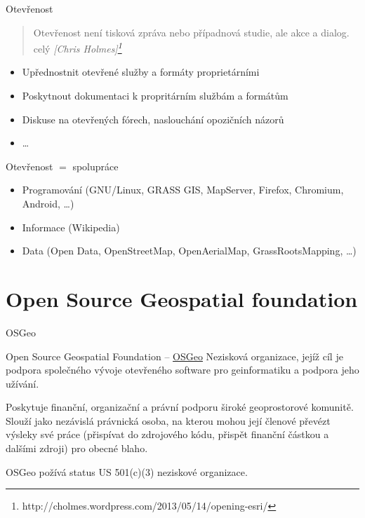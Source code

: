 \documentclass{beamer}
\begin{document}
\begin{frame}{Otevřenost}
    
    \begin{quote}
        Otevřenost není tisková zpráva nebo případnová studie, ale akce a dialog.
        celý \em{[Chris Holmes]}\footnote{http://cholmes.wordpress.com/2013/05/14/opening-esri/}
    \end{quote}

    \begin{itemize}
        \item Upřednostnit otevřené služby a formáty proprietárními
            \pause
        \item Poskytnout dokumentaci k propritárním službám a formátům
            \pause
        \item Diskuse na otevřených fórech, naslouchání opozičních názorů
        \item \dots
    \end{itemize}
\end{frame}

\begin{frame}{Otevřenost $=$ spolupráce}
    \begin{itemize}
        \item Programování (GNU/Linux, GRASS GIS, MapServer, Firefox, Chromium,
        Android, \dots)
            \pause
        \item Informace (Wikipedia)
            \pause
        \item Data (Open Data, OpenStreetMap, OpenAerialMap, GrassRootsMapping,
        \dots)
    \end{itemize}
\end{frame}

\section{Open Source Geospatial foundation}

\begin{frame}{OSGeo}
\begin{block}{Open Source Geospatial Foundation -- \href{http://osgeo.org}{OSGeo}}
Nezisková organizace, jejíž cíl je podpora společného vývoje otevřeného software
pro geinformatiku a podpora jeho užívání. 

Poskytuje finanční, organizační a právní podporu široké geoprostorové komunitě.
Slouží jako nezávislá právnická osoba, na kterou mohou její členové převézt
výsleky své práce (přispívat do zdrojového kódu, přispět finanční částkou a
dalšími zdroji) pro obecné blaho.

OSGeo požívá status US 501(c)(3) neziskové organizace.
\end{block}
\end{frame}
\end{document}
